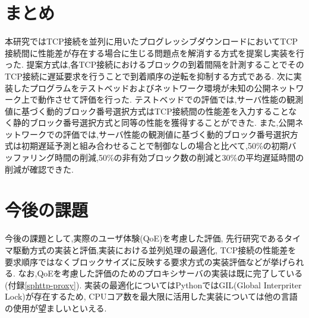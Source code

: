 \documentclass[a4j,12pt]{gradthesis_utf8}
\begin{document}
\section{まとめ}
本研究ではTCP接続を並列に用いたプログレッシブダウンロードにおいてTCP接続間に性能差が存在する場合に生じる問題点を解消する方式を提案し実装を行った.
提案方式は,各TCP接続におけるブロックの到着間隔を計測することでそのTCP接続に遅延要求を行うことで到着順序の逆転を抑制する方式である.
次に実装したプログラムをテストベッドおよびネットワーク環境が未知の公開ネットワーク上で動作させて評価を行った.
テストベッドでの評価では,サーバ性能の観測値に基づく動的ブロック番号選択方式はTCP接続間の性能差を入力することなく静的ブロック番号選択方式と同等の性能を獲得することができた.
また,公開ネットワークでの評価では,サーバ性能の観測値に基づく動的ブロック番号選択方式は初期遅延予測と組み合わせることで制御なしの場合と比べて,50\%の初期バッファリング時間の削減,50\%の非有効ブロック数の削減と30\%の平均遅延時間の削減が確認できた.


\section{今後の課題}
今後の課題として,実際のユーザ体験(QoE)を考慮した評価\cite{future},
先行研究であるタイマ駆動方式の実装と評価,実装における並列処理の最適化,
TCP接続の性能差を要求順序ではなくブロックサイズに反映する要求方式の実装評価などが挙げられる.
なお,QoEを考慮した評価のためのプロキシサーバの実装は既に完了している(付録\ref{sphttp-proxy}).
実装の最適化についてはPythonではGIL(Global Interpriter Lock)が存在するため,
CPUコア数を最大限に活用した実装については他の言語の使用が望ましいといえる.
\end{document}
